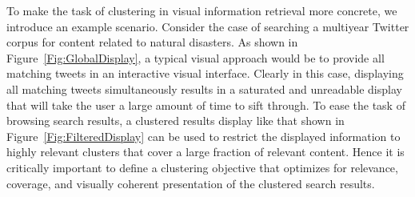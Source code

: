 
To make the task of clustering in visual information retrieval more concrete, we introduce an example scenario.
Consider the case of searching a multiyear Twitter corpus for content related to natural disasters.  
As shown in Figure~\ref{Fig:GlobalDisplay}, a typical visual approach would be to provide all matching tweets in an interactive visual interface.
Clearly in this case, displaying all matching tweets simultaneously
results in a saturated and unreadable display that will take the user a large amount of time to sift through. 
To ease the task of browsing search results, a clustered results display like that shown in Figure~\ref{Fig:FilteredDisplay} can be used to restrict the displayed information to highly relevant clusters that cover a large fraction of relevant content. 
Hence it is critically important to define a clustering objective that optimizes for relevance, coverage, and visually coherent presentation of the clustered search results. %

